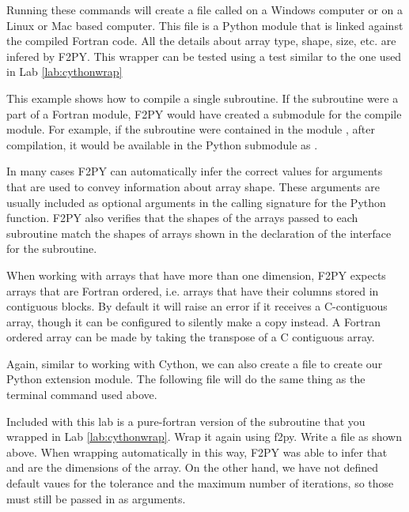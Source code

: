 Running these commands will create a file called  on a Windows computer or  on a Linux or Mac based computer.
This file is a Python module that is linked against the compiled Fortran code.
All the details about array type, shape, size, etc. are infered by F2PY.
This wrapper can be tested using a test similar to the one used in Lab \ref{lab:cythonwrap}

\begin{info}
This example shows how to compile a single subroutine.
If the subroutine were a part of a Fortran module, F2PY would have created a submodule for the compile module.
For example, if the subroutine were contained in the module , after compilation, it would be available in the Python submodule  as .
\end{info}

\begin{info}
In many cases F2PY can automatically infer the correct values for arguments that are used to convey information about array shape.
These arguments are usually included as optional arguments in the calling signature for the Python function.
F2PY also verifies that the shapes of the arrays passed to each subroutine match the shapes of arrays shown in the declaration of the interface for the subroutine.
\end{info}

\begin{warn}
When working with arrays that have more than one dimension, F2PY expects arrays that are Fortran ordered, i.e. arrays that have their columns stored in contiguous blocks.
By default it will raise an error if it receives a C-contiguous array, though it can be configured to silently make a copy instead.
A Fortran ordered array can be made by taking the transpose of a C contiguous array.
\end{warn}

Again, similar to working with Cython, we can also create a  file to create our Python extension module.
The following  file will do the same thing as the terminal command used above.


\begin{problem}
Included with this lab is a pure-fortran version of the  subroutine that you wrapped in Lab \ref{lab:cythonwrap}.
Wrap it again using f2py.
Write a  file as shown above.
When wrapping automatically in this way, F2PY was able to infer that  and  are the dimensions of the array.
On the other hand, we have not defined default vaues for the tolerance and the maximum number of iterations, so those must still be passed in as arguments.
\end{problem}


